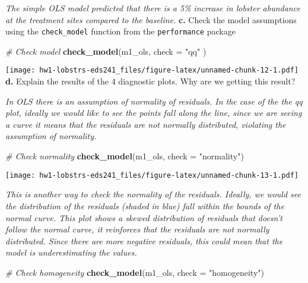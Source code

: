 \documentclass[
]{article}
\newenvironment{Shaded}{\begin{snugshade}}{\end{snugshade}}
\newcommand{\AttributeTok}[1]{\textcolor[rgb]{0.13,0.29,0.53}{#1}}
\newcommand{\CommentTok}[1]{\textcolor[rgb]{0.56,0.35,0.01}{\textit{#1}}}
\newcommand{\FunctionTok}[1]{\textcolor[rgb]{0.13,0.29,0.53}{\textbf{#1}}}
\newcommand{\NormalTok}[1]{#1}
\newcommand{\StringTok}[1]{\textcolor[rgb]{0.31,0.60,0.02}{#1}}
\begin{document}
\emph{The simple OLS model predicted that there is a 5\% increase in
lobster abundance at the treatment sites compared to the baseline.}
\textbf{c.} Check the model assumptions using the \texttt{check\_model}
function from the \texttt{performance} package

\begin{Shaded}
\begin{Highlighting}[]
\CommentTok{\# Check model}
\FunctionTok{check\_model}\NormalTok{(m1\_ols,  }\AttributeTok{check =} \StringTok{"qq"}\NormalTok{ )}
\end{Highlighting}
\end{Shaded}

\texttt{[image: hw1-lobstrs-eds241\_files/figure-latex/unnamed-chunk-12-1.pdf]}
\textbf{d.} Explain the results of the 4 diagnostic plots. Why are we
getting this result?

\emph{In OLS there is an assumption of normality of residuals. In the
case of the the qq plot, ideally we would like to see the points fall
along the line, since we are seeing a curve it means that the residuals
are not normally distributed, violating the assumption of normality.}

\begin{Shaded}
\begin{Highlighting}[]
\CommentTok{\# Check normality}
\FunctionTok{check\_model}\NormalTok{(m1\_ols, }\AttributeTok{check =} \StringTok{"normality"}\NormalTok{)}
\end{Highlighting}
\end{Shaded}

\texttt{[image: hw1-lobstrs-eds241\_files/figure-latex/unnamed-chunk-13-1.pdf]}

\emph{This is another way to check the normality of the residuals.
Ideally, we would see the distribution of the residuals (shaded in blue)
fall within the bounds of the normal curve. This plot shows a skewed
distribution of residuals that doesn't follow the normal curve, it
reinforces that the residuals are not normally distributed. Since there
are more negative residuals, this could mean that the model is
underestimating the values.}

\begin{Shaded}
\begin{Highlighting}[]
\CommentTok{\# Check homogeneity}
\FunctionTok{check\_model}\NormalTok{(m1\_ols, }\AttributeTok{check =} \StringTok{"homogeneity"}\NormalTok{)}
\end{Highlighting}
\end{Shaded}
\end{document}
